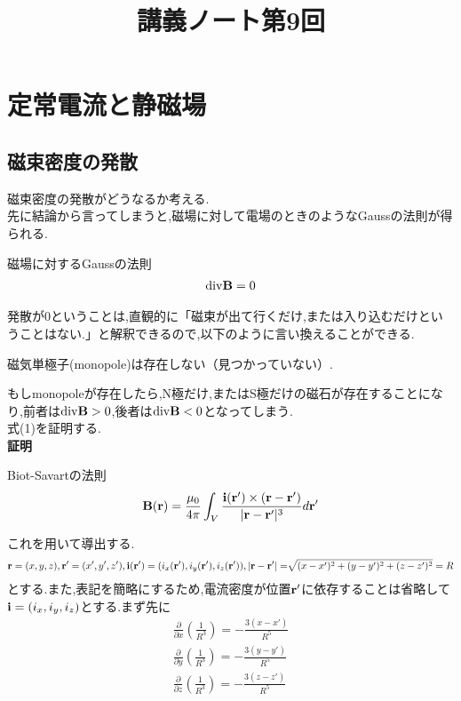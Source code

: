 \documentclass{jsarticle}
\title{講義ノート第9回}
\author{}
\date{}
\begin{document}
\maketitle

\setcounter{section}{1}

\section{定常電流と静磁場}

\setcounter{subsection}{2}


\subsection{磁束密度の発散}
磁束密度の発散がどうなるか考える. \\
先に結論から言ってしまうと,磁場に対して電場のときのようなGaussの法則が得られる.
\begin{itembox}[c]{磁場に対するGaussの法則}
\begin{eqnarray}
{\rm div}{\bf B}=0
\end{eqnarray}
\end{itembox}
発散が0ということは,直観的に「磁束が出て行くだけ,または入り込むだけということはない.」と解釈できるので,以下のように言い換えることができる.
\begin{center}
磁気単極子(monopole)は存在しない（見つかっていない）.
\end{center}
もしmonopoleが存在したら,N極だけ,またはS極だけの磁石が存在することになり,前者は${\rm div}{\bf B}>0$,後者は${\rm div}{\bf B}<0$となってしまう. \\
式(1)を証明する. \\
{\bf 証明} \\
\begin{itembox}[c]{Biot-Savartの法則}
\begin{eqnarray}
{\bf B}({\bf r})=\frac{\mu_0}{4 \pi} \int_{V}^{}\frac{{\bf i}({\bf r'}) \times ({\bf r}-{\bf r'})}{|{\bf r}-{\bf r'}|^3} d{\bf r'}
\end{eqnarray}
\end{itembox}
これを用いて導出する.
\begin{eqnarray*}
{\bf r}=(x,y,z),{\bf r'}=(x',y',z'),{\bf i}({\bf r'})=(i_x({\bf r'}),i_y({\bf r'}),i_z({\bf r'})),|{\bf r}-{\bf r'}|=\sqrt[]{\mathstrut (x-x')^2+(y-y')^2+(z-z')^2}=R
\end{eqnarray*}
とする.また,表記を簡略にするため,電流密度が位置${\bf r'}$に依存することは省略して${\bf i}=(i_x,i_y,i_z)$とする.まず先に
\begin{eqnarray*}
\frac{\partial}{\partial x} \left( \frac{1}{R^3} \right) = - \frac{3(x-x')}{R^5} \\
\frac{\partial}{\partial y} \left( \frac{1}{R^3} \right) = - \frac{3(y-y')}{R^5} \\
\frac{\partial}{\partial z} \left( \frac{1}{R^3} \right) = - \frac{3(z-z')}{R^5} \\
\end{eqnarray*}
\end{document}
